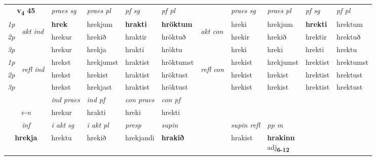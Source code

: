 \noindent
\begin{tabular}{lllllllllll} \toprule
\multicolumn{2}{c}{\textbf{v{\textsubscript{4}}} \Large{\textbf{45}}}  &  \textit{praes sg}  & \textit{praes pl}  &\textit{ pf sg} & \textit{pf pl} &  &  \textit{praes sg}  & \textit{praes pl}  & \textit{pf sg} & \textit{pf pl } \\*
	\cmidrule{3-6} \cmidrule{8-11}
 {\textit{1p}} & \multirow{3}{*}{\begin{turn}{90}\textit{akt ind}\end{turn}} & \textbf{hrek} & hrekjum & \textbf{hrakti} & \textbf{hröktum} & \multirow{3}{*}{\begin{turn}{90}\textit{akt con}\end{turn}} &hreki & hrekjum & \textbf{hrekti} & hrektum\\*
 {\textit{2p}} &  &  hrekur  & hrekið & hraktir & hröktuð & & hrekir & hrekið & hrektir & hrektuð \\*
{\textit{3p}} &  & hrekur & hrekja & hrakti & hröktu & & hreki & hreki& hrekti & hrektu \\*
\cmidrule{3-6} \cmidrule{8-11}
 {\textit{1p}} & \multirow{3}{*}{\begin{turn}{90}\textit{refl ind}\end{turn}}  & hrekst & hrekjumst & hraktist & hröktumst & \multirow{3}{*}{\begin{turn}{90}\textit{refl con}\end{turn}}  &hrekist & hrekjumst & hrektist & hrektumst \\*
 {\textit{2p}} &  & hrekst & hrekist & hraktist & hröktust & &hrekist & hrekist & hrektist & hrektust \\*
 {\textit{3p}}  & & hrekst & hrekjast & hraktist & hröktust & & hrekist & hrekist& hrektist & hrektust \\*
\cmidrule{3-6} \cmidrule{8-11}

   & &  \textit{ind praes} & \textit{ind pf} & \textit{con praes} & \textit{con pf} \\*
\multicolumn{2}{c}{ \textit{e-n} } & hrekur & hrakti & hreki & hrekti \\*

\cmidrule{3-9}
   \multicolumn{2}{c}{\textit{inf}}  & \textit{i akt sg} & \textit{i akt pl}   & \textit{presp} & \textit{supin} && \textit{supin refl} & \textit{pp m} \\*
  \multicolumn{2}{c}{\textbf{hrekja}} & hrektu  & hrekið   & hrekjandi &  \textbf{hrakið} && hrakist & \specialcell{\textbf{hrakinn} \\ adj\textbf{\textsubscript{6-12}}} \\*
\end{tabular}

